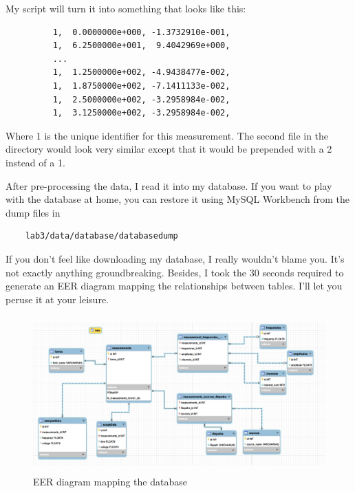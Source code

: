 \documentclass{article}
\begin{document}
My script will turn it into something that looks like this:
\begin{figure}[thp]
\centering
\begin{minipage}{.8\textwidth}
\begin{tcolorbox}
\begin{verbatim} 
    1,  0.0000000e+000, -1.3732910e-001,
    1,  6.2500000e+001,  9.4042969e+000,
    ...
    1,  1.2500000e+002, -4.9438477e-002,
    1,  1.8750000e+002, -7.1411133e-002,
    1,  2.5000000e+002, -3.2958984e-002,
    1,  3.1250000e+002, -3.2958984e-002,
\end{verbatim}
\end{tcolorbox}
\end{minipage}
\end{figure}

Where 1 is the unique identifier for this measurement. The second file in the
directory would look very similar except that it would be prepended with a 2
instead of a 1. 

After pre-processing the data, I read it into my database. If you want to play
with the database at home, you can restore it using MySQL Workbench from the
dump files in 

\begin{verbatim}
    lab3/data/database/databasedump
\end{verbatim}

If you don't feel like downloading my database, I really wouldn't blame you.
It's not exactly anything groundbreaking. Besides, I took the 30 seconds
required to generate an EER diagram mapping the relationships between tables.
I'll let you peruse it at your leisure.

\begin{figure}[H]
\begin{minipage}{1.12\textwidth}
\begin{tcolorbox}
    \centering
        \includegraphics[width=12.5cm, height=6cm]{figures/figure1.png}
        \caption{EER diagram mapping the database}
        \label{fig:fig1}
\end{tcolorbox}
\end{minipage}
\end{figure}
\end{document}

